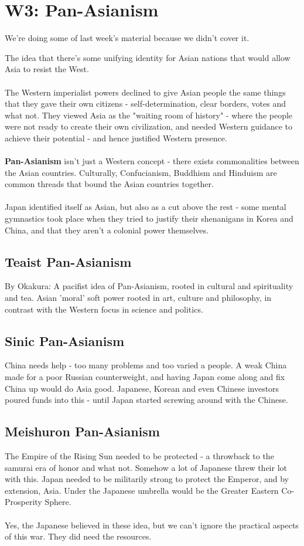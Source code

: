 \documentclass[a4paper]{article}
\begin{document}
\section{W3: Pan-Asianism}
\begin{displayquote}
	We're doing some of last week's material because we didn't cover it.
\end{displayquote}
The idea that there's some unifying identity for Asian nations that would allow Asia to resist the West.\\
\\
The Western imperialist powers declined to give Asian people the same things that they gave their own citizens - self-determination, clear borders, votes and what not. They viewed Asia as the "waiting room of history" - where the people were not ready to create their own civilization, and needed Western guidance to achieve their potential - and hence justified Western presence.\\
\\
\textbf{Pan-Asianism} isn't just a Western concept - there exists commonalities between the Asian countries. Culturally, Confucianism, Buddhism and Hinduism are common threads that bound the Asian countries together.\\
\\
Japan identified itself as Asian, but also as a cut above the rest - some mental gymnastics took place when they tried to justify their shenanigans in Korea and China, and that they aren't a colonial power themselves. 
\subsection{Teaist Pan-Asianism}
By Okakura: A pacifist idea of Pan-Asianism, rooted in cultural and spirituality and tea. Asian 'moral' soft power rooted in art, culture and philosophy, in contrast with the Western focus in science and politics.
\subsection{Sinic Pan-Asianism}
China needs help - too many problems and too varied a people. A weak China made for a poor Russian counterweight, and having Japan come along and fix China up would do Asia good. Japanese, Korean and even Chinese investors poured funds into this - until Japan started screwing around with the Chinese.
\subsection{Meishuron Pan-Asianism}
The Empire of the Rising Sun needed to be protected - a throwback to the samurai era of honor and what not. Somehow  a lot of Japanese threw their lot with this. Japan needed to be militarily strong to protect the Emperor, and by extension, Asia. Under the Japanese umbrella would be the Greater Eastern Co-Prosperity Sphere.\\
\\
Yes, the Japanese believed in these idea, but we can't ignore the practical aspects of this war. They did need the resources.
\end{document}
